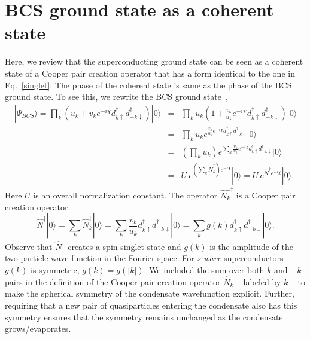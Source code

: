 \documentclass[10pt,letterpaper,aps,onecolumn,superscriptaddress,floatfix,notitlepage]{revtex4-1}
\begin{document}
	\section{BCS ground state as a coherent state\label{Ap:bcscoherent}}
	Here, we review that the superconducting ground state can be seen as a coherent state of a Cooper pair creation operator that has a form identical to the one in Eq.~\eqref{singlet}. The phase of the coherent state is same as the phase of the BCS ground state. To see this, we rewrite the BCS ground state~\cite{annett2004superconductivity},
	\begin{eqnarray}
	|\Psi_{BCS}\rangle = 		\prod_{k}(u_{k}+v_{k}e^{-i\chi} d_{k\uparrow}^{\dagger}d_{-k\downarrow}^{\dagger})|0\rangle&=&\prod_{k}u_{k}(1+\frac{v_{k}}{u_{k}}e^{-i\chi} d_{k\uparrow}^{\dagger}d_{-k\downarrow}^{\dagger})|0\rangle\\
	&=& \prod_{k}u_{k}e^{\frac{v_{k}}{u_{k}}e^{-i\chi} d_{k\uparrow}^{\dagger}d_{-k\downarrow}^{\dagger}}|0\rangle\\
	&=& (\prod_{k}u_{k})e^{\sum\limits_{k}\frac{v_{k}}{u_{k}}e^{-i\chi} d_{k\uparrow}^{\dagger}d_{-k\downarrow}^{\dagger}}|0\rangle\\
	&=&U~e^{(\sum\limits_{k}\hat{N}_{k}^{\dagger})e^{-i\chi}}|0\rangle = U~e^{\hat{N}^{\dagger}e^{-i\chi}}|0\rangle.
	\end{eqnarray}
	Here $U$ is an overall normalization constant. The operator  $\hat{N_{k}}^{\dagger}$ is a Cooper pair creation operator:
	\begin{equation}
	\hat{N}^{\dagger}|0\rangle =\sum\limits_{k}\hat{N}_{k}^{\dagger}|0\rangle = \sum\limits_{k}\frac{v_{k}}{u_{k}} d_{k\uparrow}^{\dagger}d_{-k\downarrow}^{\dagger}|0\rangle =  \sum\limits_{k}g(k) d_{k\uparrow}^{\dagger}d_{-k\downarrow}^{\dagger}|0\rangle.	
	\end{equation}
	Observe that  $\hat{N}^{\dagger}$ creates a spin singlet state and $g(k)$ is the amplitude of the two particle wave function in the Fourier space. For \textit{s wave} superconductors $g(k)$ is symmetric, $g(k) = g(|k|)$. We included the sum over both $k$ and $-k$ pairs in the definition of the Cooper pair creation operator $\hat{N}_{k}$ -- labeled by $k$ -- to make the spherical symmetry of the condensate wavefunction explicit. Further, requiring that a new pair of quasiparticles entering the condensate also has this symmetry ensures that the symmetry remains unchanged as the condensate grows/evaporates.
	
	
\end{document}
